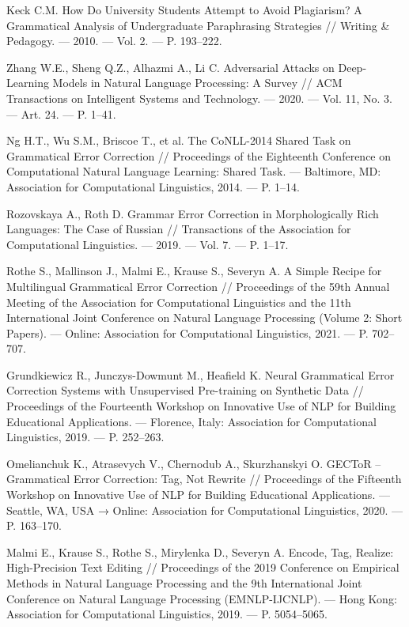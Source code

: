 \begin{thebibliography}{99}
Keck C.M. How Do University Students Attempt to Avoid Plagiarism? A Grammatical Analysis of Undergraduate Paraphrasing Strategies // Writing \& Pedagogy. — 2010. — Vol. 2. — P. 193–222.

Zhang W.E., Sheng Q.Z., Alhazmi A., Li C. Adversarial Attacks on Deep-Learning Models in Natural Language Processing: A Survey // ACM Transactions on Intelligent Systems and Technology. — 2020. — Vol. 11, No. 3. — Art. 24. — P. 1–41.

Ng H.T., Wu S.M., Briscoe T., et al. The CoNLL-2014 Shared Task on Grammatical Error Correction // Proceedings of the Eighteenth Conference on Computational Natural Language Learning: Shared Task. — Baltimore, MD: Association for Computational Linguistics, 2014. — P. 1–14.

Rozovskaya A., Roth D. Grammar Error Correction in Morphologically Rich Languages: The Case of Russian // Transactions of the Association for Computational Linguistics. — 2019. — Vol. 7. — P. 1–17.

Rothe S., Mallinson J., Malmi E., Krause S., Severyn A. A Simple Recipe for Multilingual Grammatical Error Correction // Proceedings of the 59th Annual Meeting of the Association for Computational Linguistics and the 11th International Joint Conference on Natural Language Processing (Volume 2: Short Papers). — Online: Association for Computational Linguistics, 2021. — P. 702–707.

Grundkiewicz R., Junczys-Dowmunt M., Heafield K. Neural Grammatical Error Correction Systems with Unsupervised Pre-training on Synthetic Data // Proceedings of the Fourteenth Workshop on Innovative Use of NLP for Building Educational Applications. — Florence, Italy: Association for Computational Linguistics, 2019. — P. 252–263.

Omelianchuk K., Atrasevych V., Chernodub A., Skurzhanskyi O. GECToR – Grammatical Error Correction: Tag, Not Rewrite // Proceedings of the Fifteenth Workshop on Innovative Use of NLP for Building Educational Applications. — Seattle, WA, USA → Online: Association for Computational Linguistics, 2020. — P. 163–170.

Malmi E., Krause S., Rothe S., Mirylenka D., Severyn A. Encode, Tag, Realize: High-Precision Text Editing // Proceedings of the 2019 Conference on Empirical Methods in Natural Language Processing and the 9th International Joint Conference on Natural Language Processing (EMNLP-IJCNLP). — Hong Kong: Association for Computational Linguistics, 2019. — P. 5054–5065.


\end{thebibliography}

